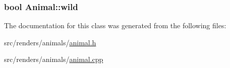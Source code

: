 \subsubsection[{\texorpdfstring{wild}{wild}}]{\setlength{\rightskip}{0pt plus 5cm}bool Animal\+::wild\hspace{0.3cm}{\ttfamily [protected]}}\hypertarget{classAnimal_a6228996b6df852e6db2776c07c084afe}{}\label{classAnimal_a6228996b6df852e6db2776c07c084afe}


The documentation for this class was generated from the following files\+:\begin{DoxyCompactItemize}
\item 
src/renders/animals/\hyperlink{animal_8h}{animal.\+h}\item 
src/renders/animals/\hyperlink{animal_8cpp}{animal.\+cpp}\end{DoxyCompactItemize}
